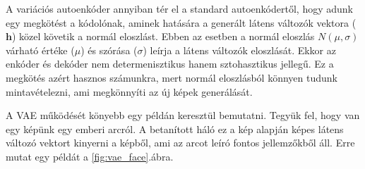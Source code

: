 

A variációs autoenkóder annyiban tér el a standard autoenkódertől, hogy adunk egy megkötést a kódolónak, aminek hatására a generált látens változók vektora ($\textbf{h}$) közel követik a normál eloszlást. Ebben az esetben a normál eloszlás $N(\mu,\sigma)$ várható értéke ($\mu$) és szórása ($\sigma$) leírja a látens változók eloszlását. Ekkor az enkóder és dekóder nem determenisztikus hanem sztohasztikus jellegű. Ez a megkötés azért hasznos számunkra, mert normál eloszlásból könnyen tudunk mintavételezni, ami megkönnyíti az új képek generálását. 




A VAE működését könyebb egy példán keresztül bemutatni. Tegyük fel, hogy van egy képünk egy emberi arcról. A betanított háló ez a kép alapján képes látens változó vektort kinyerni a képből, ami az arcot leíró fontos jellemzőkből áll. Erre mutat egy példát a \ref{fig:vae_face}.ábra.

